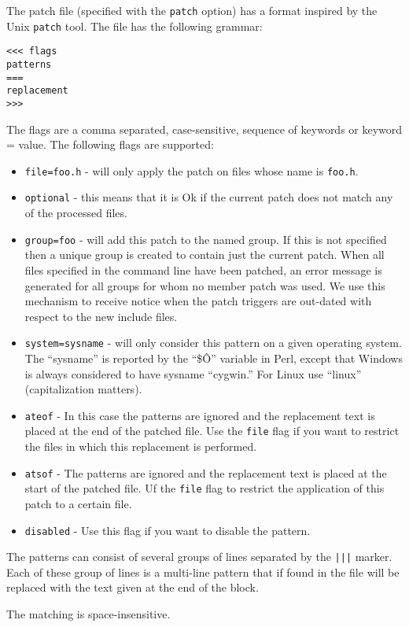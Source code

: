 \documentclass{article}
\def\t#1{{\tt #1}}
\begin{document}
 The patch file (specified with the \t{patch} option) has a format inspired by
the Unix \t{patch} tool. The file has the following grammar:

\begin{verbatim}
<<< flags
patterns
===
replacement
>>>
\end{verbatim}

 The flags are a comma separated, case-sensitive, sequence of keywords or
keyword = value. The following flags are supported:
\begin{itemize}
\item \t{file=foo.h} - will only apply the patch on files whose name is
                       \t{foo.h}. 
\item \t{optional} - this means that it is Ok if the current patch does not
match any of the processed files. 
\item \t{group=foo} - will add this patch to the named group. If this is not
specified then a unique group is created to contain just the current patch.
When all files specified in the command line have been patched, an error
message is generated for all groups for whom no member patch was used. We use
this mechanism to receive notice when the patch triggers are out-dated with
respect to the new include files. 
\item \t{system=sysname} - will only consider this pattern on a given
operating system. The ``sysname'' is reported by the ``\$\^O'' variable in
Perl, except that Windows is always considered to have sysname
``cygwin.'' For Linux use ``linux'' (capitalization matters).
\item \t{ateof} - In this case the patterns are ignored and the replacement
text is placed at the end of the patched file. Use the \t{file} flag if you
want to restrict the files in which this replacement is performed. 
\item \t{atsof} - The patterns are ignored and the replacement text is placed
at the start of the patched file. Uf the \t{file} flag to restrict the
application of this patch to a certain file. 
\item \t{disabled} - Use this flag if you want to disable the pattern.
\end{itemize}


 The patterns can consist of several groups of lines separated by the \t{|||}
marker. Each of these group of lines is a multi-line pattern that if found in
the file will be replaced with the text given at the end of the block. 

 The matching is space-insensitive.
\end{document}
